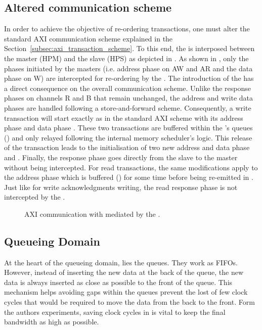 \subsection{Altered communication scheme}\label{sec:communication-scheme}
In order to achieve the objective of re-ordering transactions, one
must alter the standard AXI communication scheme explained in the
Section~\ref{subsec:axi_transaction_scheme}.  To this end, the \schim
is interposed between the master (HPM) and the slave (HPS) as depicted
in . As shown in
, only the phases initiated
by the masters (i.e. address phase on AW and AR and the data phase on
W) are intercepted for re-ordering by the \schim.  The introduction of
the \schim has a direct consequence on the overall communication
scheme. Unlike the response phases on channels R and B that remain
unchanged, the address and write data phases are handled following a
store-and-forward scheme.  Consequently, a write transaction will
start exactly as in the standard AXI scheme with its address phase
 and data phase .  These two transactions are
buffered within the \schim's queues () and only relayed
following the internal memory scheduler's logic.  This release of the
transaction leads to the initialisation of two new address and data
phase  and .  Finally, the response phase
 goes directly from the slave to the master without being
intercepted.  For read transactions, the same modifications apply to
the address phase  which is buffered () for
some time before being re-emitted in .  Just like for
write acknowledgments writing, the read response phase  is
not intercepted by the \schim.

\begin{figure}
  \centering
  
  \caption{AXI communication with mediated by the \schim.}
  \label{fig:SchIM_transaction_scheme_figure}
\end{figure}

\subsection{Queueing Domain}
At the heart of the queueing domain, lies the queues. They work as FIFOs. 
However, instead of inserting the new data at the back of the queue, 
the new data is always inserted as close as possible to the front of the 
queue. This mechanism helps avoiding gaps within the queues prevent the 
lost of few clock cycles that would be required to move the data from 
the back to the front. Form the authors experiments, saving clock cycles 
in \schim is vital to keep the final bandwidth as high as possible.

